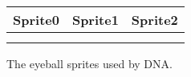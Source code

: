 \begin{figure}[H]
  {
    \setlength{\tabcolsep}{1.0pt}
    \setlength\cmidrulewidth{\heavyrulewidth} %
    \begin{adjustbox}{width=14cm,center}
      \begin{tabular}{ccc}
        \toprule
        Sprite0 & Sprite1 & Sprite2 \\
        \midrule
\makecell[l]{
	\begin{subfigure}{0.3\textwidth}
    \def\MULTICOLORONE{red}
    \def\MULTICOLORTWO{white}
    \def\SPRITECOLOR{yellow}
		
	\end{subfigure}
} &
\makecell[l]{
	\begin{subfigure}{0.3\textwidth}
    \def\MULTICOLORONE{red}
    \def\MULTICOLORTWO{white}
    \def\SPRITECOLOR{green}
		
	\end{subfigure}
} &
\makecell[l]{
	\begin{subfigure}{0.3\textwidth}
    \def\MULTICOLORONE{red}
    \def\MULTICOLORTWO{white}
    \def\SPRITECOLOR{lightblue}
		
	\end{subfigure}
} \\ 
        \addlinespace
        \bottomrule
      \end{tabular}
    \end{adjustbox}
  }\caption{The eyeball sprites used by DNA.}
\end{figure}
